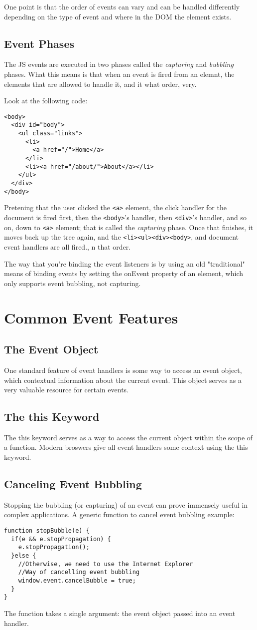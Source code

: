 \documentclass[a4paper,11pt]{book}
\begin{document}
One point is that the order of events can vary and can be handled differently
depending on the type of event and where in the DOM the element exists. 
\subsection{Event Phases}
The JS events are executed in two phases called the \emph{capturing} and
\emph{bubbling} phases. What this means is that when an event is fired from an
elemnt, the elements that are allowed to handle it, and it what order, very. 

Look at the following code:
\begin{verbatim}
<body>
  <div id="body">
    <ul class="links">
      <li>
        <a href="/">Home</a>
      </li>
      <li><a href="/about/">About</a></li>
    </ul>
  </div>
</body>
\end{verbatim}
Pretening that the user clicked the \verb|<a>| element, the click handler for
the document is fired first, then the \verb|<body>|'s handler, then
\verb|<div>|'s handler, and so on, down to \verb|<a>| element; that is called
the \emph{capturing} phase. Once that finishes, it moves back up the tree again,
and the \verb|<li><ul><div><body>|, and document event handlers are all fired.,
n that order.

The way that you're binding the event listeners is by using an old "traditional"
means of binding events by setting the onEvent property of an element, which
only supports event bubbling, not capturing. 
\section{Common Event Features}
\subsection{The Event Object}
One standard feature of event handlers is some way to access an event object,
which contextual information about the current event. This object serves as a
very valuable resource for certain events. 
\subsection{The this Keyword}
The this keyword serves as a way to access the current object within the scope
of a function. Modern broswers give all event handlers some context using the
this keyword.
\subsection{Canceling Event Bubbling}
Stopping the bubbling (or capturing) of an event can prove immensely useful in
complex applications. A generic function to cancel event bubbling example:
\begin{verbatim}
function stopBubble(e) {
  if(e && e.stopPropagation) {
    e.stopPropagation();
  }else {
    //Otherwise, we need to use the Internet Explorer
    //Way of cancelling event bubbling
    window.event.cancelBubble = true; 
  }
}
\end{verbatim}
The function takes a single argument: the event object passed into an event
handler.
\end{document}
